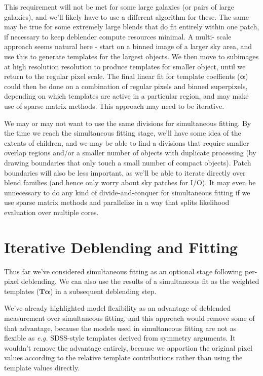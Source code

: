 \documentclass[10pt]{article}
\begin{document}
This requirement will not be met for some large galaxies (or pairs of large
galaxies), and we'll likely have to use a different algorithm for these.  The
same may be true for some extremely large blends that do fit entirely within
one patch, if necessary to keep deblender compute resources minimal.  A multi-
scale approach seems natural here - start on a binned image of a larger sky
area, and use this to generate templates for the largest objects.  We then
move to subimages at high resolution resolution to produce templates for
smaller object, until we return to the regular pixel scale. The final linear
fit for template coeffients ($\bm{\alpha}$) could then be done on a
combination of regular pixels and binned superpixels, depending on which
templates are active in a particular region, and may make use of sparse matrix
methods.  This approach may need to be iterative.

We may or may not want to use the same divisions for simultaneous fitting.  By
the time we reach the simultaneous fitting stage, we'll have some idea of the
extents of children, and we may be able to find a divisions that require
smaller overlap regions and/or a smaller number of objects with duplicate
processing (by drawing boundaries that only touch a small number of compact
objects). Patch boundaries will also be less important, as we'll be able to
iterate directly over blend families (and hence only worry about sky patches
for I/O).  It may even be unnecessary to do any kind of divide-and-conquer for
simultaneous fitting if we use sparse matrix methods and parallelize in a way
that splits likelihood evaluation over multiple cores.

\section{Iterative Deblending and Fitting}

Thus far we've considered simultaneous fitting as an optional stage following
per-pixel deblending.  We can also use the results of a simultaneous fit as
the weighted templates ($\bm{T}\bm{\alpha}$) in a subsequent deblending step.

We've already highlighted model flexibility as an advantage of deblended
measurement over simultaneous fitting, and this approach would remove
some of that advantage, because the models used in simultaneous fitting are
not as flexible as {\em e.g.} SDSS-style templates derived from symmetry
arguments.  It wouldn't remove the advantage entirely, because we apportion
the original pixel values according to the relative template contributions
rather than using the template values directly.
\end{document}
